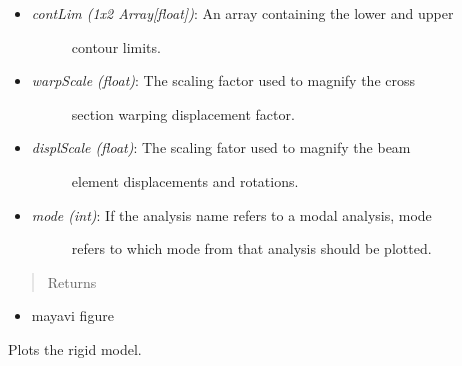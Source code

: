 \documentclass[letterpaper,10pt,english]{sphinxmanual}
\begin{document}
\begin{fulllineitems}
\begin{fulllineitems}
\begin{itemize}
\begin{description}
\end{description}

\item {} \begin{description}
\item[{\emph{contLim (1x2 Array{[}float{]})}: An array containing the lower and upper}] \leavevmode
contour limits.

\end{description}

\item {} \begin{description}
\item[{\emph{warpScale (float)}: The scaling factor used to magnify the cross}] \leavevmode
section warping displacement factor.

\end{description}

\item {} \begin{description}
\item[{\emph{displScale (float)}: The scaling fator used to magnify the beam}] \leavevmode
element displacements and rotations.

\end{description}

\item {} \begin{description}
\item[{\emph{mode (int)}: If the analysis name refers to a modal analysis, mode}] \leavevmode
refers to which mode from that analysis should be plotted.

\end{description}

\end{itemize}
\begin{quote}\begin{description}
\item[{Returns}] \leavevmode
\end{description}\end{quote}
\begin{itemize}
\item {} 
mayavi figure

\end{itemize}

\end{fulllineitems}


\begin{fulllineitems}
\label{FEM:AeroComBAT.FEM.Model.plotRigidModel}
Plots the rigid model.


\end{fulllineitems}
\end{fulllineitems}
\end{document}
